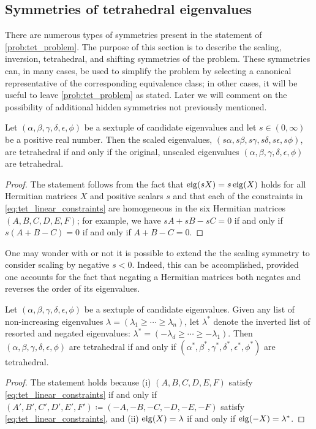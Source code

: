 \documentclass[notitlepage, 10pt]{article}
\begin{document}
\subsection{Symmetries of tetrahedral eigenvalues}
\label{sec:symmetries}

There are numerous types of symmetries present in the statement of \cref{prob:tet_problem}.
The purpose of this section is to describe the scaling, inversion, tetrahedral, and shifting symmetries of the problem.
These symmetries can, in many cases, be used to simplify the problem by selecting a canonical representative of the corresponding equivalence class; in other cases, it will be useful to leave \cref{prob:tet_problem} as stated.
Later we will comment on the possibility of additional hidden symmetries not previously mentioned.

\begin{prop}
    Let $(\alpha, \beta, \gamma, \delta, \epsilon, \phi)$ be a sextuple of candidate eigenvalues and let $s \in (0, \infty)$ be a positive real number.
    Then the scaled eigenvalues, $(s\alpha, s\beta, s\gamma, s\delta, s\epsilon, s\phi)$, are tetrahedral if and only if the original, unscaled eigenvalues $(\alpha, \beta, \gamma, \delta, \epsilon, \phi)$ are tetrahedral.
\end{prop}
\begin{proof}
    The statement follows from the fact that $\operatorname{eig}(s X) = s \operatorname{eig}(X)$ holds for all Hermitian matrices $X$ and positive scalars $s$ and that each of the constraints in \cref{eq:tet_linear_constraints} are homogeneous in the six Hermitian matrices $(A,B,C,D,E,F)$; for example, we have $sA+sB-sC=0$ if and only if $s(A+B-C)=0$ if and only if $A+B-C=0$.
\end{proof}

One may wonder with or not it is possible to extend the the scaling symmetry to consider scaling by negative $s < 0$.
Indeed, this can be accomplished, provided one accounts for the fact that negating a Hermitian matrices both negates and reverses the order of its eigenvalues.
\begin{prop}
    \label{prop:inversion}
    Let $(\alpha, \beta, \gamma, \delta, \epsilon, \phi)$ be a sextuple of candidate eigenvalues. 
    Given any list of non-increasing eigenvalues $\lambda = (\lambda_1 \geq \cdots \geq \lambda_n)$, let $\lambda^{*}$ denote the inverted list of resorted and negated eigenvalues: $\lambda^{*} = (-\lambda_d \geq \cdots \geq - \lambda_1)$.
    Then $(\alpha, \beta, \gamma, \delta, \epsilon, \phi)$ are tetrahedral if and only if $(\alpha^{*}, \beta^{*}, \gamma^{*}, \delta^{*}, \epsilon^{*}, \phi^{*})$ are tetrahedral.
\end{prop}
\begin{proof}
    The statement holds because (i) $(A,B,C,D,E,F)$ satisfy \cref{eq:tet_linear_constraints} if and only if $(A',B',C',D',E',F') \coloneqq (-A,-B,-C,-D,-E,-F)$ satisfy \cref{eq:tet_linear_constraints}, and (ii) $\operatorname{eig}(X) = \lambda$ if and only if $\operatorname{eig}(-X) = \lambda^{*}$.
\end{proof}
\end{document}
